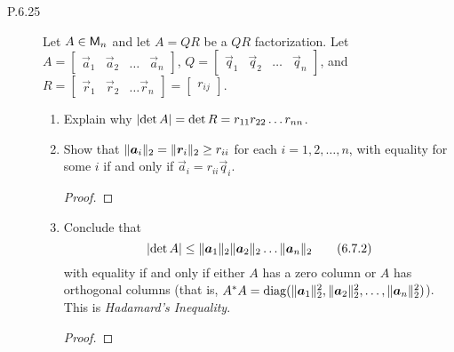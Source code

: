 \documentclass{../homework}
\date{Tuesday 2/19}
\author{}
\begin{document}
\begin{description}
\item[P.6.25] Let \(A \in \mathsf{M}_n\) and let \(A = QR\) be a \(QR\)
  factorization.  Let
  \(
  A =
  \begin{bmatrix}
    \vec a_1 & \vec a_2 & \dots & \vec a_n
  \end{bmatrix}
  \),
  \(
  Q =
  \begin{bmatrix}
    \vec q_1 & \vec q_2 & \dots & \vec q_n
  \end{bmatrix}
  \),
  and
  \(
  R =
  \begin{bmatrix}
    \vec r_1 & \vec r_2 & \dots \vec r_n
  \end{bmatrix}
  =
  \begin{bmatrix} r_{ij} \end{bmatrix}
  \).
  \begin{enumerate}
  \item Explain why
    \(\lvert {\det A} \rvert = \det R = r_{11} r_{22} \dots r_{nn}\).

    \begin{solution}

    \end{solution}

  \item Show that \(\norm{\vec a_i}_2 = \norm{\vec r_i}_2 \ge r_{ii}\)
    for each \(i = 1, 2, \dots, n\), with equality for some \(i\) if
    and only if \(\vec a_i = r_{ii} \vec q_i\).

    \begin{solution}
      \begin{proof}

      \end{proof}
    \end{solution}

  \item Conclude that
    \[
      \abs{\det A} \le \norm{\vec a_1}_2 \norm{\vec a_2}_2
      \dots \norm{\vec a_n}_2
      \tag{6.7.2}
    \]
    with equality if and only if either \(A\) has a zero column or
    \(A\) has orthogonal columns (that is,
    \(A^* A = \diag (\norm{\vec a_1}_2^2, \norm{\vec a_2}_2^2, \dots,
    \norm{\vec a_n}_2^2)\)).  This is \textit{Hadamard's Inequality}.

    \begin{solution}
      \begin{proof}

      \end{proof}
    \end{solution}
  \end{enumerate}


\end{description}
\end{document}
